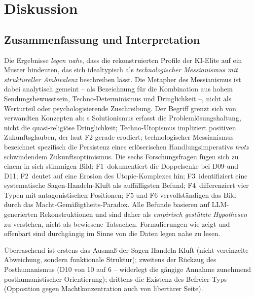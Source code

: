 \documentclass[12pt,a4paper]{article}
\begin{document}
\section{Diskussion}
\label{sec:diskussion}

\subsection{Zusammenfassung und Interpretation}
\label{sec:diskussion:zusammenfassung}

Die Ergebnisse \emph{legen nahe}, dass die rekonstruierten Profile der KI-Elite auf ein Muster hindeuten, das sich idealtypisch als \emph{technologischer Messianismus mit struktureller Ambivalenz} beschreiben l\"asst. Die Metapher des \glqq Messianismus\grqq{} ist dabei analytisch gemeint -- als Bezeichnung f\"ur die Kombination aus hohem Sendungsbewusstsein, Techno-Determinismus und Dringlichkeit --, nicht als Werturteil oder psychologisierende Zuschreibung. Der Begriff grenzt sich von verwandten Konzepten ab: \citeauthor{Morozov2013}s \glqq Solutionismus\grqq{} erfasst die Probleml\"osungshaltung, nicht die quasi-religi\"ose Dringlichkeit; \glqq Techno-Utopismus\grqq{} impliziert positiven Zukunftsglauben, der laut F2 gerade erodiert; \glqq technologischer Messianismus\grqq{} bezeichnet spezifisch die Persistenz eines erl\"oserischen Handlungsimperativs \emph{trotz} schwindendem Zukunftsoptimismus. Die sechs Forschungsfragen f\"ugen sich zu einem in sich stimmigen Bild: F1~dokumentiert die \glqq Doppelsenke\grqq{} bei D09 und D11; F2~deutet auf eine Erosion des Utopie-Komplexes hin; F3~identifiziert eine systematische Sagen-Handeln-Kluft als auff\"alligsten Befund; F4~differenziert vier Typen mit antagonistischen Positionen; F5 und F6 vervollst\"andigen das Bild durch das Macht-Gem\"a\ss{}igtheits-Paradox. Alle Befunde basieren auf LLM-generierten Rekonstruktionen und sind daher als \emph{empirisch gest\"utzte Hypothesen} zu verstehen, nicht als bewiesene Tatsachen. Formulierungen wie \glqq zeigt\grqq{} und \glqq offenbart\grqq{} sind durchg\"angig im Sinne von \glqq die Daten legen nahe\grqq{} zu lesen.

\"Uberraschend ist erstens das Ausma\ss{} der Sagen-Handeln-Kluft (nicht vereinzelte Abweichung, sondern funktionale Struktur); zweitens der R\"uckzug des Posthumanismus (D10 von 10 auf 6 -- widerlegt die g\"angige Annahme zunehmend posthumanistischer Orientierung); drittens die Existenz des Befreier-Typs (Opposition gegen Machtkonzentration auch von libert\"arer Seite).
\end{document}
